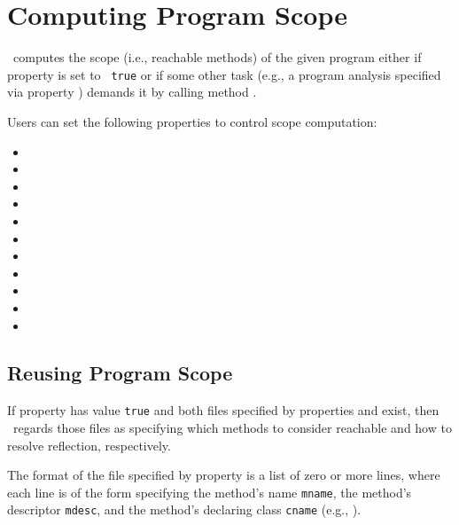 \section{Computing Program Scope}
\label{sec:building-scope}

\Chord\ computes the scope (i.e., reachable methods) of the given
program either if property  is set to {\tt
  true} or if some other task (e.g., a program analysis specified via
property ) demands it by calling method
.

Users can set the following properties to control scope computation:

\begin{itemize}
\item {}
\item {}
\item {}
\item {}
\item {}
\item {}
\item {}
\item {}
\item {}
\item {}
\item {}
\end{itemize}

\subsection{Reusing Program Scope}

If property  has value {\tt true} and both
files specified by properties  and
 exist, then \Chord\ regards those files as
specifying which methods to consider reachable and how to resolve
reflection, respectively.

The format of the file specified by property 
is a list of zero or more lines, where each line is of the form
specifying the method's name {\tt mname}, the method's descriptor
{\tt mdesc}, and the method's declaring class {\tt cname} (e.g.,
\code{main:([Ljava/lang/String;)V@foo.bar.Main}).

